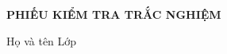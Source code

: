 \documentclass[11pt]{article}
\begin{document}
\newpage
\setcounter{socauhoi}{0}
\thispagestyle{empty}
\inphieuthi
\lamphieuthi
\begin{center}
{\bf PHIẾU KIỂM TRA TRẮC NGHIỆM}
\end{center}
Họ và tên \dotfill Lớp \dotfill 
\begin{multicols}{3}
\begin{enumerate}[\causo]
\foreachproblem[btsuatu]{\item\thisproblem}
\end{enumerate}

\begin{enumerate}[\causo]
\foreachproblem[btchontu]{\item\thisproblem}
\end{enumerate}

\begin{enumerate}[\causo]
\foreachproblem[btdungtu]{\item\thisproblem}
\end{enumerate}

\begin{enumerate}[\causo]
\foreachproblem[btcumtu]{\item\thisproblem}
\end{enumerate}

\begin{enumerate}[\causo]
\foreachproblem[bthoanthanh]{\item\thisproblem}
\end{enumerate}

\begin{enumerate}[\causo]
\foreachproblem[btcumtus]{\item\thisproblem}
\end{enumerate}
\end{multicols}
\end{document}
